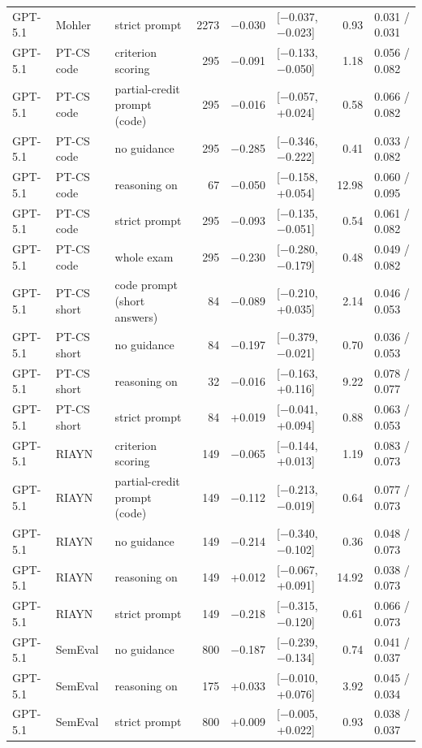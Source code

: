 \documentclass[10pt]{article}
\begin{document}
\begin{longtable}{ll>{\raggedright\arraybackslash}p{3.1cm}rrlrl}
GPT-5.1 & Mohler & strict prompt & 2273 & $-$0.030 & [$-$0.037, $-$0.023] & 0.93 & 0.031 / 0.031 \\
GPT-5.1 & PT-CS code & criterion scoring & 295 & $-$0.091 & [$-$0.133, $-$0.050] & 1.18 & 0.056 / 0.082 \\
GPT-5.1 & PT-CS code & partial-credit prompt (code) & 295 & $-$0.016 & [$-$0.057, +0.024] & 0.58 & 0.066 / 0.082 \\
GPT-5.1 & PT-CS code & no guidance & 295 & $-$0.285 & [$-$0.346, $-$0.222] & 0.41 & 0.033 / 0.082 \\
GPT-5.1 & PT-CS code & reasoning on & 67 & $-$0.050 & [$-$0.158, +0.054] & 12.98 & 0.060 / 0.095 \\
GPT-5.1 & PT-CS code & strict prompt & 295 & $-$0.093 & [$-$0.135, $-$0.051] & 0.54 & 0.061 / 0.082 \\
GPT-5.1 & PT-CS code & whole exam & 295 & $-$0.230 & [$-$0.280, $-$0.179] & 0.48 & 0.049 / 0.082 \\
GPT-5.1 & PT-CS short & code prompt (short answers) & 84 & $-$0.089 & [$-$0.210, +0.035] & 2.14 & 0.046 / 0.053 \\
GPT-5.1 & PT-CS short & no guidance & 84 & $-$0.197 & [$-$0.379, $-$0.021] & 0.70 & 0.036 / 0.053 \\
GPT-5.1 & PT-CS short & reasoning on & 32 & $-$0.016 & [$-$0.163, +0.116] & 9.22 & 0.078 / 0.077 \\
GPT-5.1 & PT-CS short & strict prompt & 84 & +0.019 & [$-$0.041, +0.094] & 0.88 & 0.063 / 0.053 \\
GPT-5.1 & RIAYN & criterion scoring & 149 & $-$0.065 & [$-$0.144, +0.013] & 1.19 & 0.083 / 0.073 \\
GPT-5.1 & RIAYN & partial-credit prompt (code) & 149 & $-$0.112 & [$-$0.213, $-$0.019] & 0.64 & 0.077 / 0.073 \\
GPT-5.1 & RIAYN & no guidance & 149 & $-$0.214 & [$-$0.340, $-$0.102] & 0.36 & 0.048 / 0.073 \\
GPT-5.1 & RIAYN & reasoning on & 149 & +0.012 & [$-$0.067, +0.091] & 14.92 & 0.038 / 0.073 \\
GPT-5.1 & RIAYN & strict prompt & 149 & $-$0.218 & [$-$0.315, $-$0.120] & 0.61 & 0.066 / 0.073 \\
GPT-5.1 & SemEval & no guidance & 800 & $-$0.187 & [$-$0.239, $-$0.134] & 0.74 & 0.041 / 0.037 \\
GPT-5.1 & SemEval & reasoning on & 175 & +0.033 & [$-$0.010, +0.076] & 3.92 & 0.045 / 0.034 \\
GPT-5.1 & SemEval & strict prompt & 800 & +0.009 & [$-$0.005, +0.022] & 0.93 & 0.038 / 0.037 \\

\end{longtable}
\end{document}
